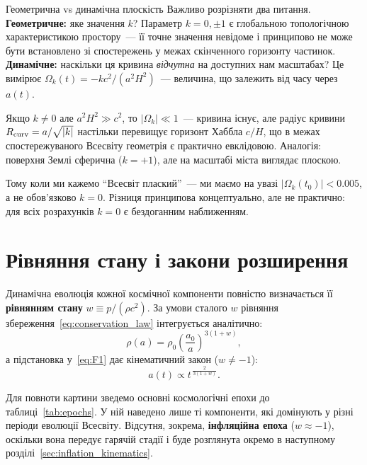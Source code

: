 \begin{keybox}{Геометрична vs динамічна плоскість}
Важливо розрізняти два питання.
\textbf{Геометричне:} яке значення $k$?
Параметр $k = 0, \pm1$ є глобальною топологічною характеристикою
простору~--- її точне значення невідоме і принципово
не може бути встановлено зі спостережень у межах
скінченного горизонту частинок.
\textbf{Динамічне:} наскільки ця кривина \emph{відчутна}
на доступних нам масштабах?
Це вимірює $\Omega_k(t) = -kc^2/(a^2H^2)$~---
величина, що залежить від часу через $a(t)$.

Якщо $k \neq 0$ але $a^2H^2 \gg c^2$, то $|\Omega_k| \ll 1$~---
кривина існує, але радіус кривини $R_{\rm curv} = a/\sqrt{|k|}$
настільки перевищує горизонт Хаббла $c/H$, що в межах
спостережуваного Всесвіту геометрія є практично евклідовою.
Аналогія: поверхня Землі сферична ($k=+1$), але на масштабі
міста виглядає плоскою.

Тому коли ми кажемо \enquote{Всесвіт плаский}~--- ми маємо на увазі
$|\Omega_k(t_0)| < 0.005$, а не обов'язково $k = 0$.
Різниця принципова концептуально, але не практично:
для всіх розрахунків $k = 0$ є бездоганним
наближенням.
\end{keybox}


\section{Рівняння стану і закони розширення}
\label{sec:eos}

Динамічна еволюція кожної космічної компоненти повністю визначається
її \textbf{рівнянням стану} $w \equiv p/(\rho c^2)$. За умови сталого $w$
рівняння збереження~\eqref{eq:conservation_law} інтегрується аналітично:
\begin{equation}\label{eq:rho_evolution}
  \rho(a) = \rho_0 \left(\frac{a_0}{a}\right)^{3(1+w)},
\end{equation}
а підстановка у~\eqref{eq:F1} дає кінематичний закон ($w \neq -1$):
\begin{equation}\label{eq:a_evolution}
  a(t) \propto t^{\,\frac{2}{3(1+w)}}.
\end{equation}

Для повноти картини зведемо основні космологічні епохи до таблиці~\ref{tab:epochs}. У ній наведено лише ті компоненти, які домінують у різні періоди
еволюції Всесвіту. Відсутня, зокрема, \textbf{інфляційна епоха}
($w \approx -1$), оскільки вона передує гарячій стадії і буде
розглянута окремо в наступному розділі~\ref{sec:inflation_kinematics}.

